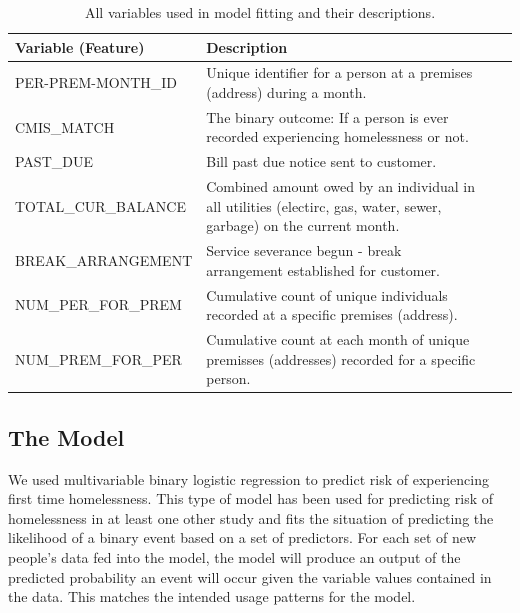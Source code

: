 \documentclass[10pt,letterpaper]{article}
\newcommand{\red}[1]{{\color{red}{#1}}}
\begin{document}
\begin{table}[htb]
    \centering
    \begin{tabular}{l p{8cm} l p{14cm}}
        \toprule
        Variable (Feature) &                  Description \\
        \midrule \vspace{0.25cm}
        PER-PREM-MONTH\_ID & Unique identifier for a person at a premises (address) during a month. \\
        \hline \vspace{0.25cm}
        CMIS\_MATCH & The binary outcome: If a person is ever recorded experiencing homelessness or not. \\
        \hline \vspace{0.25cm}
        PAST\_DUE & Bill past due notice sent to customer. \\
        \hline \vspace{0.25cm}
        TOTAL\_CUR\_BALANCE & Combined amount owed by an individual in all utilities (electirc, gas, water, sewer, garbage) on the current month. \\
        \hline \vspace{0.25cm}
        BREAK\_ARRANGEMENT & Service severance begun - break arrangement established for customer. \\
        \hline \vspace{0.25cm}
        NUM\_PER\_FOR\_PREM & Cumulative count of unique individuals recorded at a specific premises (address). \\
        \hline \vspace{0.25cm}
        NUM\_PREM\_FOR\_PER & Cumulative count at each month of unique premisses (addresses) recorded for a specific person. \\
        \midrule
    \end{tabular}
    \caption[Variables Used]{All variables used in model fitting and their descriptions.}
    \label{tbl:varsUsed}
\end{table}

\subsection*{The Model}
We used multivariable binary logistic regression to predict risk of experiencing first time homelessness. This type of model has been used for predicting risk of homelessness in at least one other study \cite{van2009longitudinal} \red{add more studies here} and fits the situation of predicting the likelihood of a binary event based on a set of predictors. For each set of new people's data fed into the model, the model will produce an output of the predicted probability an event will occur given the variable values contained in the data. This matches the intended usage patterns for the model. 
\end{document}
